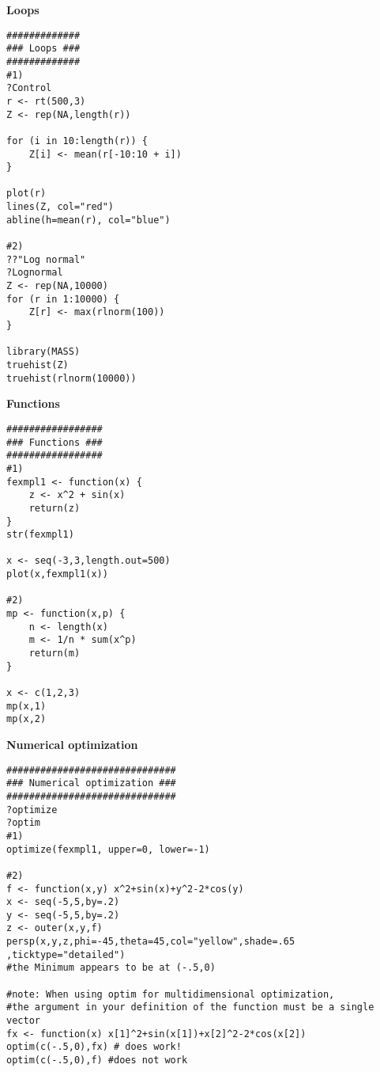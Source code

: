 \begin{Solution}{5.4}
\textbf{Loops}

\begin{verbatim}
#############
### Loops ###
#############
#1)
?Control
r <- rt(500,3)
Z <- rep(NA,length(r))

for (i in 10:length(r)) {
    Z[i] <- mean(r[-10:10 + i])
}

plot(r)
lines(Z, col="red")
abline(h=mean(r), col="blue")

#2)
??"Log normal"
?Lognormal
Z <- rep(NA,10000)
for (r in 1:10000) {
	Z[r] <- max(rlnorm(100))
}

library(MASS)
truehist(Z)
truehist(rlnorm(10000))
\end{verbatim}
\end{Solution}
\begin{Solution}{5.5}
\textbf{Functions}

\begin{verbatim}
#################
### Functions ###
#################
#1)
fexmpl1 <- function(x) {
    z <- x^2 + sin(x)
    return(z)
}
str(fexmpl1)

x <- seq(-3,3,length.out=500)
plot(x,fexmpl1(x))

#2)
mp <- function(x,p) {
	n <- length(x)
	m <- 1/n * sum(x^p)
	return(m)
}

x <- c(1,2,3)
mp(x,1)
mp(x,2)
\end{verbatim}
\end{Solution}
\begin{Solution}{5.6}
\textbf{Numerical optimization}

\begin{verbatim}
##############################
### Numerical optimization ###
##############################
?optimize
?optim
#1)
optimize(fexmpl1, upper=0, lower=-1)

#2)
f <- function(x,y) x^2+sin(x)+y^2-2*cos(y)
x <- seq(-5,5,by=.2)
y <- seq(-5,5,by=.2)
z <- outer(x,y,f)
persp(x,y,z,phi=-45,theta=45,col="yellow",shade=.65 ,ticktype="detailed")
#the Minimum appears to be at (-.5,0)

#note: When using optim for multidimensional optimization,
#the argument in your definition of the function must be a single vector
fx <- function(x) x[1]^2+sin(x[1])+x[2]^2-2*cos(x[2])
optim(c(-.5,0),fx) # does work!
optim(c(-.5,0),f) #does not work
\end{verbatim}
\end{Solution}

